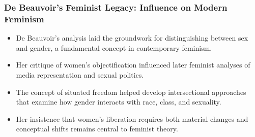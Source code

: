 \documentclass[aspectratio=169]{beamer}
\begin{document}
		\begin{frame}
			\frametitle{De Beauvoir's Feminist Legacy: Influence on Modern Feminism}
			\begin{itemize}
				\item De Beauvoir's analysis laid the groundwork for distinguishing between sex and gender, a fundamental concept in contemporary feminism.
				\item Her critique of women's objectification influenced later feminist analyses of media representation and sexual politics.
				\item The concept of situated freedom helped develop intersectional approaches that examine how gender interacts with race, class, and sexuality.
				\item Her insistence that women's liberation requires both material changes and conceptual shifts remains central to feminist theory.
			\end{itemize}
			
		\end{frame}
		
\end{document}

